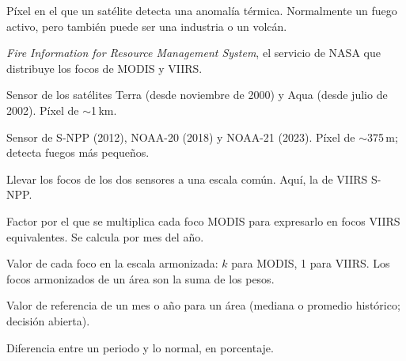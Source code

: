 \begin{description}[style=nextline]
  \item[Foco de calor] Píxel en el que un satélite detecta una anomalía térmica.
        Normalmente un fuego activo, pero también puede ser una industria o un volcán.
  \item[FIRMS] \emph{Fire Information for Resource Management System}, el servicio de
        NASA que distribuye los focos de MODIS y VIIRS.
  \item[MODIS] Sensor de los satélites Terra (desde noviembre de 2000) y Aqua (desde
        julio de 2002). Píxel de $\sim$1\,km.
  \item[VIIRS] Sensor de S-NPP (2012), NOAA-20 (2018) y NOAA-21 (2023). Píxel de
        $\sim$375\,m; detecta fuegos más pequeños.
  \item[Armonizar] Llevar los focos de los dos sensores a una escala común. Aquí, la de
        VIIRS S-NPP.
  \item[Constante $k$] Factor por el que se multiplica cada foco MODIS para expresarlo
        en focos VIIRS equivalentes. Se calcula por mes del año.
  \item[Peso] Valor de cada foco en la escala armonizada: $k$ para MODIS, 1 para VIIRS.
        Los focos armonizados de un área son la suma de los pesos.
  \item[Lo normal] Valor de referencia de un mes o año para un área (mediana o promedio
        histórico; decisión abierta).
  \item[Anomalía] Diferencia entre un periodo y lo normal, en porcentaje.
\end{description}
